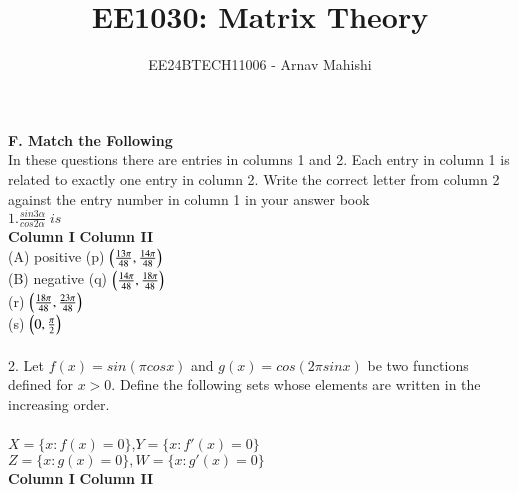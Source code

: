 \documentclass[journal,12pt,twocolumn]{IEEEtran}
\theoremstyle{remark}
\begin{document}

\vspace{3cm}

\title{EE1030: Matrix Theory}
\author{EE24BTECH11006 - Arnav Mahishi}
\maketitle
\newpage
\bigskip

\renewcommand{\thefigure}{\theenumi}
\renewcommand{\thetable}{\theenumi}
\textbf{F. Match the Following} \\
In these questions there are entries in columns 1 and 2. Each entry in column 1 is related to exactly one entry in column 2. Write the correct letter from column 2 against the entry number in column 1 in your answer book
\\
$1. \frac{sin3\alpha}{cos2\alpha} \; is $\hfill{}
\\

\textbf{Column I}  \hspace{4cm}\textbf{Column II}
\\

(A) positive \hspace{3cm} (p) $\left(\frac{13\pi}{48},\frac{14\pi}{48}\right)$
\\

(B) negative \hspace{3cm} (q) $\left(\frac{14\pi}{48},\frac{18\pi}{48}\right)$
\\

\hspace{150pt} (r) $\left(\frac{18\pi}{48},\frac{23\pi}{48}\right)$
\\

\hspace{150pt} (s) $\left(0,\frac{\pi}{2}\right)$
\\
\\

2. Let $f(x)=sin(\pi cosx)$ and $g(x)=cos(2\pi sinx)$ be two functions defined for $x>0$. Define the following sets whose elements are written in the increasing order.\hfill{}
\\\\$X=\{x:f(x)=0\}$,$Y=\{x:f'(x)=0\}$\\
$Z=\{x:g(x)=0\}, W=\{x:g'(x)=0\}$
\\

\textbf{Column I}  \hspace{2cm}\textbf{Column II}
\\
\end{document}
